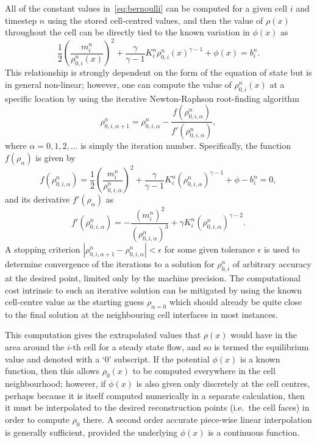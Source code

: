 All of the constant values in~\eqref{eq:bernoulli} can be computed for a given cell $i$ and timestep $n$ using the stored cell-centred values, and then the value of $\rho(x)$ throughout the cell can be directly tied to the known variation in $\phi(x)$ as
\begin{equation} \label{eq:equilibRecon}
\frac{1}{2}\left(\frac{m_i^n}{\rho_{0,i}^n(x)}\right)^2+\frac{\gamma}{\gamma-1}K_i^n\rho_{0,i}^n(x)^{\gamma-1}+\phi(x)=b_i^n.
\end{equation}
This relationship is strongly dependent on the form of the equation of state but is in general non-linear; however, one can compute the value of $\rho_{0,i}^n(x)$ at a specific location by using the iterative Newton-Raphson root-finding algorithm
\begin{equation}
\rho_{0,i,\alpha+1}^n=\rho_{0,i,\alpha}^n-\frac{f(\rho_{0,i,\alpha}^n)}{f'(\rho_{0,i,\alpha}^n)},
\end{equation}
where $\alpha=0,1,2,...$ is simply the iteration number. Specifically, the function $f(\rho_\alpha)$ is given by
\begin{equation}
f(\rho_{0,i,\alpha}^n)=\frac{1}{2}\left(\frac{m_i^n}{\rho_{0,i,\alpha}^n}\right)^2+\frac{\gamma}{\gamma-1}K_i^n\left(\rho_{0,i,\alpha}^n\right)^{\gamma-1}+\phi-b_i^n=0,
\end{equation}
and its derivative $f'(\rho_\alpha)$ as
\begin{equation}
f'(\rho_{0,i,\alpha}^n)=-\frac{(m_i^n)^2}{\left(\rho_{0,i,\alpha}^n\right)^3}+\gamma K_i^n\left(\rho_{0,i,\alpha}^n\right)^{\gamma-2}.
\end{equation}
A stopping criterion $\left|\rho_{0,i,\alpha+1}^n-\rho_{0,i,\alpha}^n\right|<\epsilon$ for some given tolerance $\epsilon$ is used to determine convergence of the iterations to a solution for $\rho_{0,i}^n$ of arbitrary accuracy at the desired point, limited only by the machine precision. The computational cost intrinsic to such an iterative solution can be mitigated by using the known cell-centre value as the starting guess $\rho_{\alpha=0}$ which should already be quite close to the final solution at the neighbouring cell interfaces in most instances.

This computation gives the extrapolated values that $\rho(x)$ would have in the area around the $i\textrm{-th}$ cell for a steady state flow, and so is termed the equilibrium value and denoted with a `$0$' subscript. If the potential $\phi(x)$ is a known function, then this allows $\rho_0(x)$ to be computed everywhere in the cell neighbourhood; however, if $\phi(x)$ is also given only discretely at the cell centres, perhaps because it is itself computed numerically in a separate calculation, then it must be interpolated to the desired reconstruction points (i.e.\ the cell faces) in order to compute $\rho_0$ there. A second order accurate piece-wise linear interpolation is generally sufficient, provided the underlying $\phi(x)$ is a continuous function.

